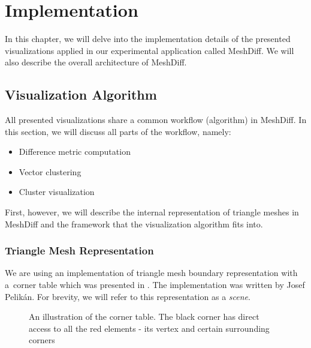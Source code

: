 \chapter{Implementation}
\label{chap:implementation}

In this chapter, we will delve into the implementation details of the presented visualizations applied in our experimental application called MeshDiff. We will also describe the overall architecture of MeshDiff.

\section{Visualization Algorithm}
\label{sec:implementation-algorithm}

All presented visualizations share a common workflow (algorithm) in MeshDiff. In this section, we will discuss all parts of the workflow, namely:

\begin{itemize}
\item Difference metric computation
\item Vector clustering
\item Cluster visualization
\end{itemize}

First, however, we will describe the internal representation of triangle meshes in MeshDiff and the framework that the visualization algorithm fits into.

\subsection{Triangle Mesh Representation}
\label{subsec:implementation-algorithm-mesh_repre}

We are using an implementation of triangle mesh boundary representation with a~corner table which was presented in \citet{Corner03}. The implementation was written by Josef Pelikán. For brevity, we will refer to this representation as a {\it scene}.

\begin{figure}[h]
\centering
\def\svgwidth{0.5\textwidth}

\caption[Corner Table Illustration]{An illustration of the corner table. The black corner has direct access to all the red elements - its vertex and certain surrounding corners}
\label{fig:illustration-corner_table}
\end{figure}

